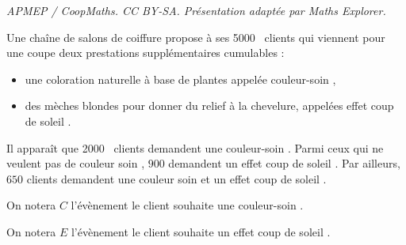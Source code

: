 \documentclass[10pt]{article}
\providecommand{\np}[2][]{{#2~#1}}
\begin{document}
\noindent\textit{APMEP / CoopMaths. CC BY-SA. Présentation adaptée par Maths Explorer.}\par\medskip
\medskip

Une chaîne de salons de coiffure propose à ses \np{5000} clients qui viennent pour une
coupe deux prestations supplémentaires cumulables :

\begin{itemize}
\item  une coloration naturelle à base de plantes appelée \og couleur-soin \fg,
\item des mèches blondes pour donner du relief à la chevelure, appelées \og effet
coup de soleil \fg.
\end{itemize}

Il apparaît que \np{2000} clients demandent une \og couleur-soin \fg. Parmi ceux qui ne
veulent pas de \og couleur soin \fg, $900$ demandent un \og effet coup de soleil \fg. Par
ailleurs, $650$ clients demandent une \og couleur soin \fg et un \og effet coup de soleil \fg.

On notera $C$ l'évènement \og le client souhaite une \og couleur-soin \fg.

On notera $E$ l'évènement \og le client souhaite un \og effet coup de soleil \fg.
\end{document}
